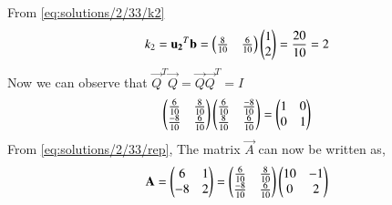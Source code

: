 From \eqref{eq:solutions/2/33/k2}
\begin{align}
    k_2=\mathbf{u_2}^T\mathbf{b}=\begin{pmatrix}\frac{8}{10}&\frac{6}{10}\end{pmatrix}\begin{pmatrix}1\\2\end{pmatrix}=\frac{20}{10}=2
\end{align}
Now we can observe that $\vec{Q}^T\vec{Q}=\vec{Q}\vec{Q}^T=I$
\begin{align}
    \begin{pmatrix}\frac{6}{10}&\frac{8}{10}\\\frac{-8}{10}&\frac{6}{10}\end{pmatrix}
    \begin{pmatrix}\frac{6}{10}&\frac{-8}{10}\\\frac{8}{10}&\frac{6}{10}\end{pmatrix}=\begin{pmatrix}1&0\\0&1\end{pmatrix}
\end{align}
From \eqref{eq:solutions/2/33/rep}, The matrix $\vec{A}$ can now be written as, 
\begin{align}
    \mathbf{A}=\begin{pmatrix}6&1\\-8&2\end{pmatrix}=\begin{pmatrix}\frac{6}{10}&\frac{8}{10}\\\frac{-8}{10}&\frac{6}{10}\end{pmatrix}
    \begin{pmatrix}10&-1\\0&2\end{pmatrix}
\end{align}
